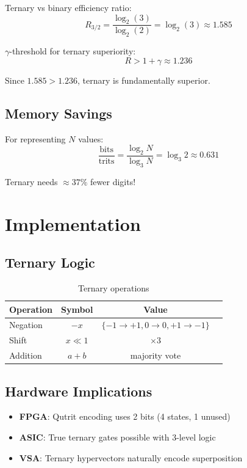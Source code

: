 \documentclass[12pt,a4paper]{article}
\begin{document}
Ternary vs binary efficiency ratio:
\begin{equation}
R_{3/2} = \frac{\log_2(3)}{\log_2(2)} = \log_2(3) \approx 1.585
\end{equation}

$\gamma$-threshold for ternary superiority:
\begin{equation}
R > 1 + \gamma \approx 1.236
\end{equation}

Since $1.585 > 1.236$, ternary is fundamentally superior.

\subsection{Memory Savings}

For representing $N$ values:
\begin{equation}
\frac{\text{bits}}{\text{trits}} = \frac{\log_2 N}{\log_3 N} = \log_3 2 \approx 0.631
\end{equation}

Ternary needs $\approx 37\%$ fewer digits!

\section{Implementation}

\subsection{Ternary Logic}

\begin{table}[h]
\centering
\begin{tabular}{lccc}
\toprule
Operation & Symbol & Value \\
\midrule
Negation & $-x$ & $\{-1 \to +1, 0 \to 0, +1 \to -1\}$ \\
Shift & $x \ll 1$ & $\times 3$ \\
Addition & $a + b$ & majority vote \\
\bottomrule
\end{tabular}
\caption{Ternary operations}
\end{table}

\subsection{Hardware Implications}

\begin{itemize}
\item \textbf{FPGA}: Qutrit encoding uses 2 bits (4 states, 1 unused)
\item \textbf{ASIC}: True ternary gates possible with 3-level logic
\item \textbf{VSA}: Ternary hypervectors naturally encode superposition
\end{itemize}
\end{document}
